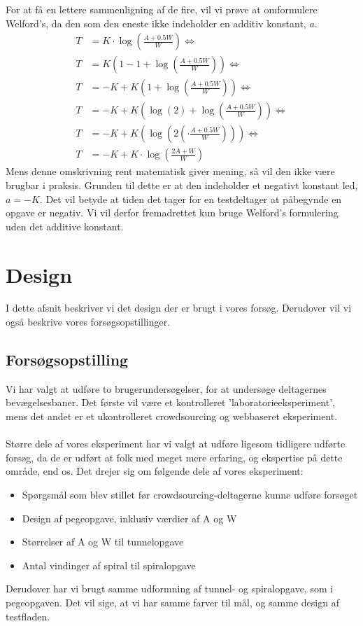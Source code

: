 For at få en lettere sammenligning af de fire, vil vi prøve at omformulere Welford's, da den som den eneste ikke indeholder en additiv konstant, $a$. 
\begin{align*}
T &= K\cdot\log\left(\frac{A+0.5W}{W}\right)\Leftrightarrow\\
T &= K\left(1-1+\log\left(\frac{A+0.5W}{W}\right)\right)\Leftrightarrow\\
T &= -K+K\left(1+\log\left(\frac{A+0.5W}{W}\right)\right)\Leftrightarrow\\
T &= -K+K\left(\log(2)+\log\left(\frac{A+0.5W}{W}\right)\right)\Leftrightarrow\\
T &= -K+K\left(\log\left(2\left(\cdot\frac{A+0.5W}{W}\right)\right)\right)\Leftrightarrow\\
T &= -K+K\cdot\log\left(\frac{2A+W}{W}\right)
\end{align*}
Mens denne omskrivning rent matematisk giver mening, så vil den ikke være brugbar i praksis. Grunden til dette er at den indeholder et negativt konstant led, $a=-K$. Det vil betyde at tiden det tager for en testdeltager at påbegynde en opgave er negativ. Vi vil derfor fremadrettet kun bruge Welford's formulering uden det additive konstant.



\newpage
{}
\chapter*{Design}
I dette afsnit beskriver vi det design der er brugt i vores forsøg. Derudover vil vi også beskrive vores forsøgsopstillinger.

\section*{Forsøgsopstilling}
Vi har valgt at udføre to brugerundersøgelser, for at undersøge deltagernes bevægelsesbaner. Det første vil være et kontrolleret 'laboratorieeksperiment', mens det andet er et ukontrolleret crowdsourcing og webbaseret eksperiment.\\\\
Større dele af vores eksperiment har vi valgt at udføre ligesom tidligere udførte forsøg, da de er udført at folk med meget mere erfaring, og ekspertise på dette område, end os.
Det drejer sig om følgende dele af vores eksperiment:
\begin{itemize}
\item Spørgsmål som blev stillet før crowdsourcing-deltagerne kunne udføre forsøget\cite{goldberg2015}
\item Design af pegeopgave, inklusiv værdier af A og W\cite{goldberg2015}
\item Størrelser af A og W til tunnelopgave\cite{accot1997}
\item Antal vindinger af spiral til spiralopgave\cite{accot1997}
\end{itemize}
Derudover har vi brugt samme udformning af tunnel- og spiralopgave, som i pegeopgaven. Det vil sige, at vi har samme farver til mål, og samme design af testfladen.


